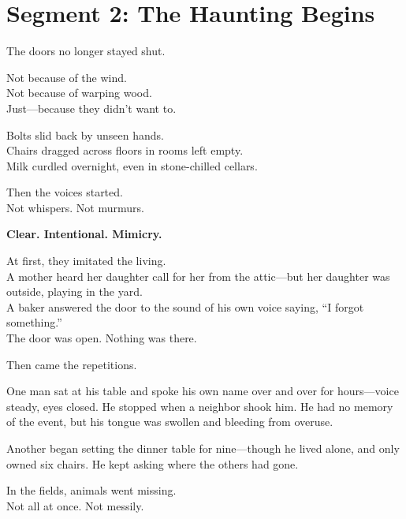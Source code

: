 \documentclass[9pt]{article}
\begin{document}
\newpage

\section*{Segment 2: The Haunting Begins}

The doors no longer stayed shut.

\vspace{0.5em}
Not because of the wind.\\
Not because of warping wood.\\
Just---because they didn’t want to.

\vspace{0.5em}
Bolts slid back by unseen hands.\\
Chairs dragged across floors in rooms left empty.\\
Milk curdled overnight, even in stone-chilled cellars.

\vspace{0.5em}
Then the voices started.\\
Not whispers. Not murmurs.

\vspace{0.5em}
\textbf{Clear. Intentional. Mimicry.}

\vspace{0.5em}
At first, they imitated the living.\\
A mother heard her daughter call for her from the attic---but her daughter was outside, playing in the yard.\\
A baker answered the door to the sound of his own voice saying, ``I forgot something.''\\
The door was open. Nothing was there.

\vspace{0.5em}
Then came the repetitions.

\vspace{0.5em}
One man sat at his table and spoke his own name over and over for hours---voice steady, eyes closed. He stopped when a neighbor shook him. He had no memory of the event, but his tongue was swollen and bleeding from overuse.

\vspace{0.5em}
Another began setting the dinner table for nine---though he lived alone, and only owned six chairs. He kept asking where the others had gone.

\vspace{0.5em}
In the fields, animals went missing.\\
Not all at once. Not messily.
\end{document}
